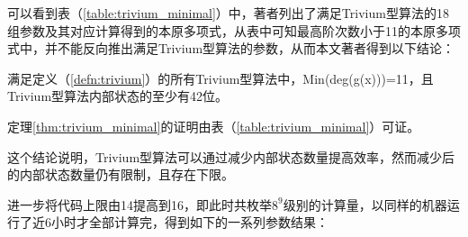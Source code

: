 可以看到表（\ref{table:trivium_minimal}）中，著者列出了满足Trivium型算法的18组参数及其对应计算得到的本原多项式，从表中可知最高阶次数小于11的本原多项式中，并不能反向推出满足Trivium型算法的参数，从而本文著者得到以下结论：
\begin{thm}[Trivium型算法对应的本原多项式最高次数最小为11]
\label{thm:trivium_minimal}
满足定义（\ref{defn:trivium}）的所有Trivium型算法中，Min(deg(g(x)))=11，且Trivium型算法内部状态的至少有42位。

定理\ref{thm:trivium_minimal}的证明由表（\ref{table:trivium_minimal}）可证。
\end{thm}

这个结论说明，Trivium型算法可以通过减少内部状态数量提高效率，然而减少后的内部状态数量仍有限制，且存在下限。

进一步将代码上限由14提高到16，即此时共枚举$8^9$级别的计算量，以同样的机器运行了近6小时才全部计算完，得到如下的一系列参数结果：

